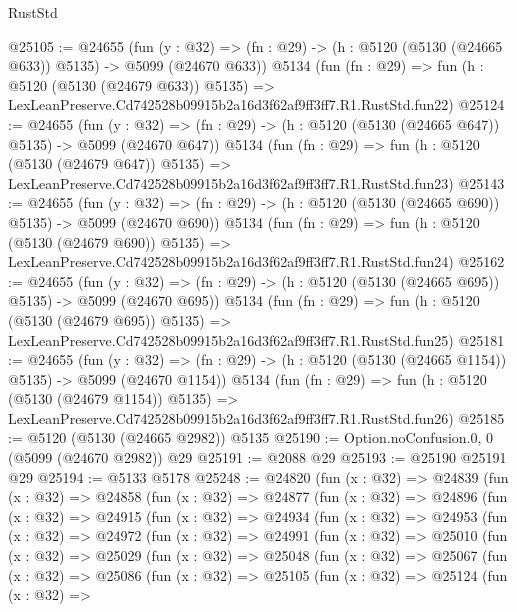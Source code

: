 \begin{lexlean}{RustStd}
\begin{coremodule}
@25105 := @24655
    (fun (y : @32) => (fn : @29) -> (h : @5120 (@5130 (@24665 @633)) @5135) -> @5099 (@24670 @633))
    @5134
    (fun (fn : @29) =>
    fun (h : @5120 (@5130 (@24679 @633)) @5135) =>
    LexLeanPreserve.Cd742528b09915b2a16d3f62af9ff3ff7.R1.RustStd.fun22)
@25124 := @24655
    (fun (y : @32) => (fn : @29) -> (h : @5120 (@5130 (@24665 @647)) @5135) -> @5099 (@24670 @647))
    @5134
    (fun (fn : @29) =>
    fun (h : @5120 (@5130 (@24679 @647)) @5135) =>
    LexLeanPreserve.Cd742528b09915b2a16d3f62af9ff3ff7.R1.RustStd.fun23)
@25143 := @24655
    (fun (y : @32) => (fn : @29) -> (h : @5120 (@5130 (@24665 @690)) @5135) -> @5099 (@24670 @690))
    @5134
    (fun (fn : @29) =>
    fun (h : @5120 (@5130 (@24679 @690)) @5135) =>
    LexLeanPreserve.Cd742528b09915b2a16d3f62af9ff3ff7.R1.RustStd.fun24)
@25162 := @24655
    (fun (y : @32) => (fn : @29) -> (h : @5120 (@5130 (@24665 @695)) @5135) -> @5099 (@24670 @695))
    @5134
    (fun (fn : @29) =>
    fun (h : @5120 (@5130 (@24679 @695)) @5135) =>
    LexLeanPreserve.Cd742528b09915b2a16d3f62af9ff3ff7.R1.RustStd.fun25)
@25181 := @24655
    (fun (y : @32) =>
    (fn : @29) -> (h : @5120 (@5130 (@24665 @1154)) @5135) -> @5099 (@24670 @1154))
    @5134
    (fun (fn : @29) =>
    fun (h : @5120 (@5130 (@24679 @1154)) @5135) =>
    LexLeanPreserve.Cd742528b09915b2a16d3f62af9ff3ff7.R1.RustStd.fun26)
@25185 := @5120 (@5130 (@24665 @2982)) @5135
@25190 := Option.noConfusion.{0, 0} (@5099 (@24670 @2982)) @29
@25191 := @2088 @29
@25193 := @25190 @25191 @29
@25194 := @5133 @5178
@25248 := @24820
    (fun (x : @32) =>
    @24839
      (fun (x : @32) =>
      @24858
        (fun (x : @32) =>
        @24877
          (fun (x : @32) =>
          @24896
            (fun (x : @32) =>
            @24915
              (fun (x : @32) =>
              @24934
                (fun (x : @32) =>
                @24953
                  (fun (x : @32) =>
                  @24972
                    (fun (x : @32) =>
                    @24991
                      (fun (x : @32) =>
                      @25010
                        (fun (x : @32) =>
                        @25029
                          (fun (x : @32) =>
                          @25048
                            (fun (x : @32) =>
                            @25067
                              (fun (x : @32) =>
                              @25086
                                (fun (x : @32) =>
                                @25105
                                  (fun (x : @32) =>
                                  @25124
                                    (fun (x : @32) =>

\end{coremodule}
\end{lexlean}
